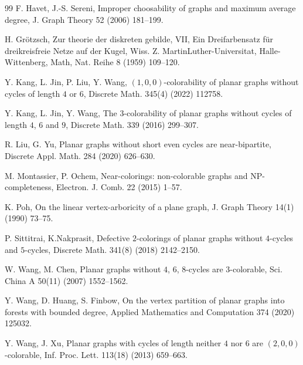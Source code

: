 \documentclass[11pt]{amsart} %
\theoremstyle{definition}
\begin{document}
\begin{thebibliography}{99}
F. Havet, J.-S. Sereni,
Improper choosability of graphs and maximum average degree, 
J. Graph Theory 52  (2006) 181--199.

H. Gr\"otzsch, 
Zur theorie der diskreten gebilde, VII, 
Ein Dreifarbensatz für dreikreisfreie Netze auf der Kugel, 
Wiss. Z. MartinLuther-Universitat, Halle-Wittenberg, 
Math, Nat. Reihe 8 (1959) 109--120.
	 
Y. Kang, L. Jin, P. Liu, Y. Wang, 
$(1,0,0)$-colorability of planar graphs without cycles 
of length $4$ or $6$,
Discrete Math. 345(4) (2022) 112758.
	
Y. Kang, L. Jin, Y. Wang, 
The $3$-colorability of planar graphs without cycles of 
length $4$, $6$ and $9$, 
Discrete Math. 339 (2016) 299--307.
	
R. Liu, G. Yu,
Planar graphs without short even cycles are near-bipartite,
Discrete Appl. Math. 284 (2020) 626--630.

M. Montassier, P. Ochem, 
Near-colorings: non-colorable graphs and NP-completeness, 
Electron. J. Comb. 22 (2015) 1--57.
	
K. Poh, 
On the linear vertex-arboricity of a plane graph, 
J. Graph Theory 14(1) (1990) 73--75.
	
P. Sittitrai, K.Nakprasit, 
Defective $2$-colorings of planar graphs without 
$4$-cycles and $5$-cycles, 
Discrete Math. 341(8) (2018) 2142--2150. 
	
W. Wang, M. Chen, 
Planar graphs without $4$, $6$, $8$-cycles are $3$-colorable,  
Sci. China A 50(11) (2007) 1552--1562.
	
	Y. Wang, D. Huang, S. Finbow,
On the vertex partition of planar graphs into forests 
with bounded degree,
Applied Mathematics and Computation 374 (2020) 125032.
	
Y. Wang, J. Xu,
Planar graphs with cycles of length neither $4$ nor $6$ 
are $(2,0,0)$-colorable, 
Inf. Proc. Lett. 113(18) (2013) 659--663.  

\end{thebibliography}
\end{document}
